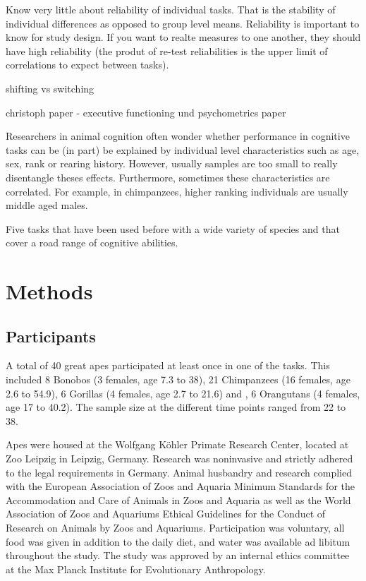 \documentclass[10pt, letterpaper]{article}
\begin{document}
Know very little about reliability of individual tasks. That is the
stability of individual differences as opposed to group level means.
Reliability is important to know for study design. If you want to realte
measures to one another, they should have high reliability (the produt
of re-test reliabilities is the upper limit of correlations to expect
between tasks).

shifting vs switching

christoph paper - executive functioning und psychometrics paper

Researchers in animal cognition often wonder whether performance in
cognitive tasks can be (in part) be explained by individual level
characteristics such as age, sex, rank or rearing history. However,
usually samples are too small to really disentangle theses effects.
Furthermore, sometimes these characteristics are correlated. For
example, in chimpanzees, higher ranking individuals are usually middle
aged males.

Five tasks that have been used before with a wide variety of species and
that cover a road range of cognitive abilities.

\hypertarget{methods}{%
\section{Methods}\label{methods}}

\hypertarget{participants}{%
\subsection{Participants}\label{participants}}

A total of 40 great apes participated at least once in one of the tasks.
This included 8 Bonobos (3 females, age 7.3 to 38), 21 Chimpanzees (16
females, age 2.6 to 54.9), 6 Gorillas (4 females, age 2.7 to 21.6) and ,
6 Orangutans (4 females, age 17 to 40.2). The sample size at the
different time points ranged from 22 to 38.

Apes were housed at the Wolfgang Köhler Primate Research Center, located
at Zoo Leipzig in Leipzig, Germany. Research was noninvasive and
strictly adhered to the legal requirements in Germany. Animal husbandry
and research complied with the European Association of Zoos and Aquaria
Minimum Standards for the Accommodation and Care of Animals in Zoos and
Aquaria as well as the World Association of Zoos and Aquariums Ethical
Guidelines for the Conduct of Research on Animals by Zoos and Aquariums.
Participation was voluntary, all food was given in addition to the daily
diet, and water was available ad libitum throughout the study. The study
was approved by an internal ethics committee at the Max Planck Institute
for Evolutionary Anthropology.
\end{document}
